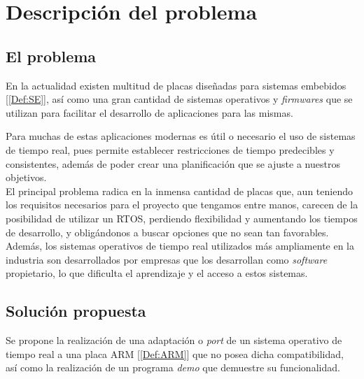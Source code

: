 \chapter{Descripción del problema}
\section{El problema}
En la actualidad existen multitud de placas diseñadas para sistemas embebidos [\ref{Def:SE}], así como una gran cantidad de sistemas operativos y \emph{firmwares} que se utilizan para facilitar el desarrollo de aplicaciones para las mismas.

Para muchas de estas aplicaciones modernas es útil o necesario el uso de sistemas de tiempo real, pues permite establecer restricciones de tiempo predecibles y consistentes, además de poder crear una planificación que se ajuste a nuestros objetivos.\\

El principal problema radica en la inmensa cantidad de placas que, aun teniendo los requisitos necesarios para el proyecto que tengamos entre manos, carecen de la posibilidad de utilizar un RTOS, perdiendo flexibilidad y aumentando los tiempos de desarrollo, y obligándonos a buscar opciones que no sean tan favorables.
Además, los sistemas operativos de tiempo real utilizados más ampliamente en la industria son desarrollados por empresas que los desarrollan como \emph{software} propietario, lo que dificulta el aprendizaje y el acceso a estos sistemas.


\section{Solución propuesta}
Se propone la realización de una adaptación o \emph{port} de un sistema operativo de tiempo real a una placa ARM [\ref{Def:ARM}] que no posea dicha compatibilidad, así como la realización de un programa \emph{demo} que demuestre su funcionalidad.


